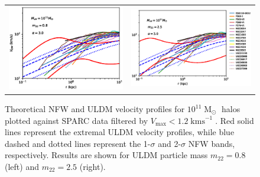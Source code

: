 \documentclass[a4paper,11pt]{article}
\begin{document}
\begin{figure}
\begin{tabular}{cc}
{\includegraphics[scale = 0.65, trim={2.5cm 2.5cm 2.1cm 0.5cm}]{pics/v_11_8_3_paper.eps}} &
{\includegraphics[scale = 0.65, trim={2.1cm 2.5cm 0cm 0.5cm}]{pics/v_11_25_3_paper.eps}}
\end{tabular}
\caption{Theoretical NFW and ULDM velocity profiles for $10^{11}\operatorname{M}_{\odot}$ halos plotted against SPARC data filtered by $V_{\mathrm{max}} < 1.2 \operatorname{kms}^{-1}$. Red solid lines represent the extremal ULDM velocity profiles, while  blue dashed and dotted lines represent the 1-$\sigma$ and 2-$\sigma$ NFW bands, respectively. Results are shown for ULDM particle mass $m_{22} = 0.8$ (left) and $m_{22} = 2.5 $ (right). }\label{fig:velocity_11}
\end{figure}
\end{document}
